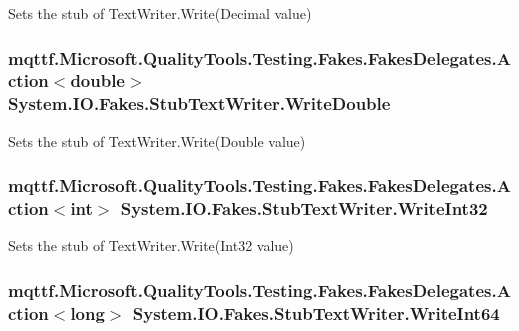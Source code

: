 Sets the stub of Text\-Writer.\-Write(\-Decimal value)

\hypertarget{class_system_1_1_i_o_1_1_fakes_1_1_stub_text_writer_a9930f33edb41a7ec3d67159c89a9ccf0}{
\subsubsection[{Write\-Double}]{\setlength{\rightskip}{0pt plus 5cm}mqttf.\-Microsoft.\-Quality\-Tools.\-Testing.\-Fakes.\-Fakes\-Delegates.\-Action$<$double$>$ System.\-I\-O.\-Fakes.\-Stub\-Text\-Writer.\-Write\-Double}}\label{class_system_1_1_i_o_1_1_fakes_1_1_stub_text_writer_a9930f33edb41a7ec3d67159c89a9ccf0}


Sets the stub of Text\-Writer.\-Write(\-Double value)

\hypertarget{class_system_1_1_i_o_1_1_fakes_1_1_stub_text_writer_a681a983ea51d4db8540f5a3ad3325a5a}{
\subsubsection[{Write\-Int32}]{\setlength{\rightskip}{0pt plus 5cm}mqttf.\-Microsoft.\-Quality\-Tools.\-Testing.\-Fakes.\-Fakes\-Delegates.\-Action$<$int$>$ System.\-I\-O.\-Fakes.\-Stub\-Text\-Writer.\-Write\-Int32}}\label{class_system_1_1_i_o_1_1_fakes_1_1_stub_text_writer_a681a983ea51d4db8540f5a3ad3325a5a}


Sets the stub of Text\-Writer.\-Write(\-Int32 value)

\hypertarget{class_system_1_1_i_o_1_1_fakes_1_1_stub_text_writer_ad64a3a2ef82af8fe3dfe8e2f6674ed3b}{
\subsubsection[{Write\-Int64}]{\setlength{\rightskip}{0pt plus 5cm}mqttf.\-Microsoft.\-Quality\-Tools.\-Testing.\-Fakes.\-Fakes\-Delegates.\-Action$<$long$>$ System.\-I\-O.\-Fakes.\-Stub\-Text\-Writer.\-Write\-Int64}}\label{class_system_1_1_i_o_1_1_fakes_1_1_stub_text_writer_ad64a3a2ef82af8fe3dfe8e2f6674ed3b}


